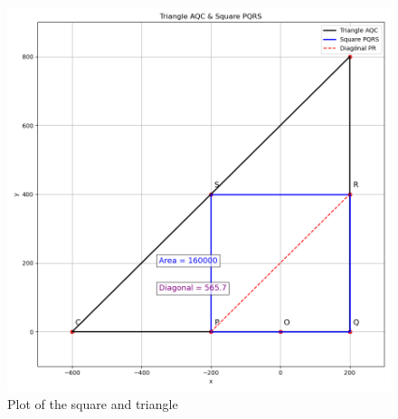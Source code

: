 \documentclass[journal]{IEEEtran}
\begin{document}
        \begin{figure}[h]
            \centering
            \includegraphics[width=0.8\linewidth]{figs/fig1.png}
            \caption{Plot of the square and triangle}
            \label{fig1}
        \end{figure}
\end{document}
